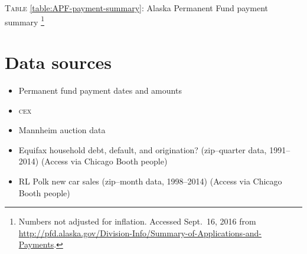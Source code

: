 \documentclass[11pt,letterpaper,oneside]{article}
\newcommand{\cex}{\textsc{cex}}
\begin{document}
\noindent\begin{minipage}{\textwidth}
	\centering
	\label{table:APF-payment-summary}
	\textsc{Table} \ref{table:APF-payment-summary}: Alaska Permanent Fund payment summary%
	\footnote{Numbers not adjusted for inflation. Accessed Sept.\ 16, 2016 from \url{http://pfd.alaska.gov/Division-Info/Summary-of-Applications-and-Payments}.}
	
	\vspace{1em}
    
\end{minipage}

\section{Data sources}

\begin{itemize}
    \item Permanent fund payment dates and amounts
    \item \cex
    \item Mannheim auction data
    \item Equifax household debt, default, and origination? (zip--quarter data, 1991--2014)  (Access via Chicago Booth people)
    \item RL Polk new car sales (zip--month data, 1998--2014)  (Access via Chicago Booth people)
\end{itemize}
\printbibliography
\end{document}
